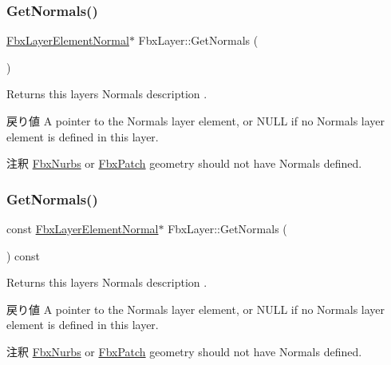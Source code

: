 \subsubsection{\texorpdfstring{Get\+Normals()}{GetNormals()}\hspace{0.1cm}{\footnotesize\ttfamily [1/2]}}
{\footnotesize\ttfamily \hyperlink{class_fbx_layer_element_normal}{Fbx\+Layer\+Element\+Normal}$\ast$ Fbx\+Layer\+::\+Get\+Normals (\begin{DoxyParamCaption}{ }\end{DoxyParamCaption})}

Returns this layer\textquotesingle{}s Normals description . \begin{DoxyReturn}{戻り値}
A pointer to the Normals layer element, or {\ttfamily N\+U\+LL} if no Normals layer element is defined in this layer. 
\end{DoxyReturn}
\begin{DoxyRemark}{注釈}
\hyperlink{class_fbx_nurbs}{Fbx\+Nurbs} or \hyperlink{class_fbx_patch}{Fbx\+Patch} geometry should not have Normals defined. 
\end{DoxyRemark}
\mbox{\label{class_fbx_layer_ad727fbf6b7d9918b48d706d5a19ebc42}} 
\subsubsection{\texorpdfstring{Get\+Normals()}{GetNormals()}\hspace{0.1cm}{\footnotesize\ttfamily [2/2]}}
{\footnotesize\ttfamily const \hyperlink{class_fbx_layer_element_normal}{Fbx\+Layer\+Element\+Normal}$\ast$ Fbx\+Layer\+::\+Get\+Normals (\begin{DoxyParamCaption}{ }\end{DoxyParamCaption}) const}

Returns this layer\textquotesingle{}s Normals description . \begin{DoxyReturn}{戻り値}
A pointer to the Normals layer element, or {\ttfamily N\+U\+LL} if no Normals layer element is defined in this layer. 
\end{DoxyReturn}
\begin{DoxyRemark}{注釈}
\hyperlink{class_fbx_nurbs}{Fbx\+Nurbs} or \hyperlink{class_fbx_patch}{Fbx\+Patch} geometry should not have Normals defined. 
\end{DoxyRemark}
\mbox{\label{class_fbx_layer_ab199f10be53e1c787ac36a3bc0619b60}} 
